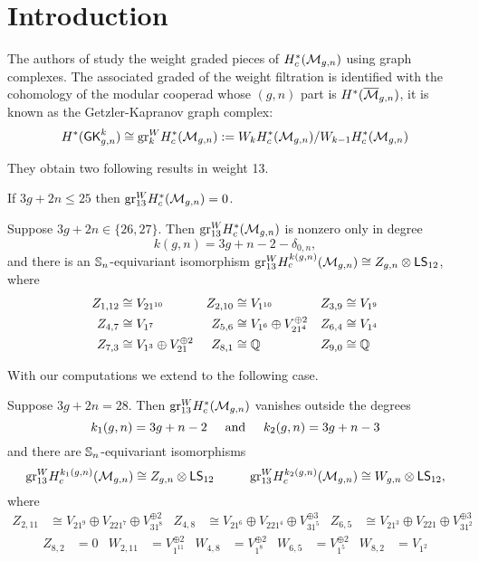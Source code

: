 



\section{Introduction}

The authors of \cite{CLPW2} study the weight graded pieces of $H^*_c(\M_{g,n})$ using graph complexes. The associated graded of the weight filtration is identified with the cohomology of the modular cooperad whose $(g,n)$ part is $H^*(\Mb_{g,n})$, it is known as the Getzler-Kapranov graph complex:
\begin{equation}
    H^*(\GK_{g,n}^k) \cong  \gr^W_k H^*_c(\M_{g,n}) := W_k H^*_c(\M_{g,n})/W_{k-1}H^*_c(\M_{g,n})
\end{equation}

They obtain two following results in weight 13.
\begin{prop}\label{prop:wt 13 vanishing}
    If $3g + 2n \leq 25$ then $\gr_{13}^W H^*_c(\M_{g,n}) = 0$.
\end{prop}

\begin{thm} \label{thm:lowexc13}
    Suppose $3g + 2n \in \{26, 27\}$. Then $\gr_{13}^W H^*_c(\M_{g,n})$ is nonzero only in degree $$k(g,n) = 3g + n - 2 - \delta_{0,n},$$ and there is an $\ss_n$-equivariant isomorphism $\gr_{13}^W H^{k(g,n)}_c(\cM_{g,n}) \cong Z_{g,n} \otimes \lstw$, where
\begin{align*}
    Z_{1,12} & \cong V_{21^{10}} & Z_{2,10} & \cong V_{1^{10}} & Z_{3,9} & \cong V_{1^{9}} \\
    Z_{4,7} & \cong V_{1^{7}} & Z_{5,6} & \cong V_{1^{6}} \oplus V_{21^4}^{\oplus 2} & Z_{6,4} & \cong V_{1^{4}} \\ Z_{7,3} & \cong V_{1^{3}} \oplus V_{21}^{\oplus 2}& Z_{8,1} & \cong \Q & Z_{9,0} & \cong \Q 
\end{align*}
\end{thm}

With our computations we extend to the following case.
\begin{thm} \label{thm:excess28}
    Suppose $3g + 2n =28$. Then $\gr_{13}^W H^*_c(\M_{g,n})$ vanishes outside the degrees $$k_1(g,n) = 3g + n - 2 \hspace{.5cm}\text{and}\hspace{.5cm} k_2(g,n) = 3g + n - 3$$ and there are $\ss_n$-equivariant isomorphisms $$ \gr_{13}^W H^{k_1(g,n)}_c(\cM_{g,n}) \cong Z_{g,n} \otimes \lstw  \hspace{1cm} \gr_{13}^W H^{k_2(g,n)}_c(\cM_{g,n}) \cong W_{g,n} \otimes \lstw , $$ where
\begin{align*}
    Z_{2,11} &\cong V_{21^{9}}\oplus V_{221^7} \oplus V_{31^8}^{\oplus 2} & Z_{4,8} &\cong V_{21^6}\oplus V_{221^4}\oplus V_{31^5}^{\oplus 3} & Z_{6,5} &\cong V_{21^3}\oplus V_{221}\oplus V_{31^2}^{\oplus 3}
\end{align*}
\begin{align*}
    Z_{8,2}&=0 &  W_{2,11}&=V_{1^{11}}^{\oplus 2} & W_{4,8}&=V_{1^8}^{\oplus 2} & W_{6,5}&=V_{1^5}^{\oplus 2} & W_{8,2}&=V_{1^2}
\end{align*}
\end{thm}